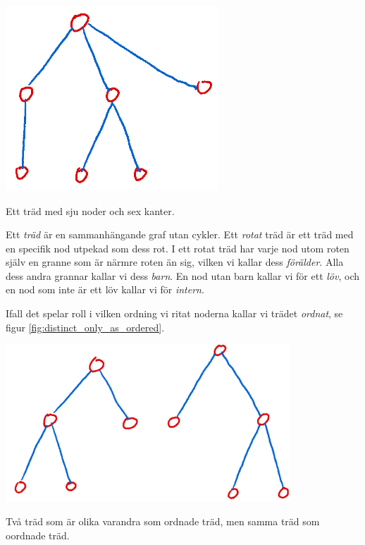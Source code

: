\documentclass[nobib]{tufte-handout}
\begin{document}
\begin{definition}
    \begin{marginfigure}
        \centering
        \includegraphics[width=0.6\textwidth]{graphics/example_tree.png}
        \caption{Ett träd med sju noder och sex kanter.}
    \end{marginfigure}

    Ett \emph{träd} är en sammanhängande graf utan cykler. Ett \emph{rotat} träd är ett träd med en specifik nod utpekad som dess rot. I ett rotat träd har varje nod utom roten själv en granne som är närmre roten än sig, vilken vi kallar dess \emph{förälder}. Alla dess andra grannar kallar vi dess \emph{barn}. En nod utan barn kallar vi för ett \emph{löv}, och en nod som inte är ett löv kallar vi för \emph{intern}.

    Ifall det spelar roll i vilken ordning vi ritat noderna kallar vi trädet \emph{ordnat}, se figur \ref{fig:distinct_only_as_ordered}.

    \begin{marginfigure}
        \centering
        \includegraphics[width=0.8\textwidth]{graphics/ordered_versus_unordered_trees.png}
        \caption{Två träd som är olika varandra som ordnade träd, men samma träd som oordnade träd.}
        \label{fig:distinct_only_as_ordered}
    \end{marginfigure}
\end{definition}
\end{document}
